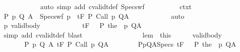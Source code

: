 \begin{isabellebody}
\ \ \ \ \ \ \ \ \ \ \isamarkupfalse%
\ {\isacharparenleft}auto\ simp\ add{\isacharcolon}\ cvalidt{\isacharunderscore}def\ Specs{\isacharunderscore}wf{\isacharparenright}\isanewline
\ \ \ \ \ \ \ \ \isamarkupfalse%
\ ctxt\ \isamarkupfalse%
\ {\isachardoublequoteopen}{\isasymforall}{\isacharparenleft}P{\isacharcomma}\ p{\isacharcomma}\ Q{\isacharcomma}\ A{\isacharparenright}{\isasymin}{\isasymTheta}\ {\isasymunion}\ Specs{\isacharunderscore}wf\ p\ {\isasymtau}{\isachardot}\ {\isasymGamma}{\isasymTurnstile}\isactrlsub t\isactrlbsub {\isacharslash}F\isactrlesub \ P\ Call\ p\ Q{\isacharcomma}A{\isachardoublequoteclose}\isanewline
\ \ \ \ \ \ \ \ \ \ \isamarkupfalse%
\ auto\isanewline
\ \ \ \ \ \ \ \ \isamarkupfalse%
\ p\ valid{\isacharunderscore}body\ \isanewline
\ \ \ \ \ \ \ \ \isamarkupfalse%
\ {\isachardoublequoteopen}{\isasymGamma}\ {\isasymTurnstile}\isactrlsub t\isactrlbsub {\isacharslash}F\isactrlesub \ {\isacharparenleft}{\isacharbraceleft}{\isasymtau}{\isacharbraceright}\ {\isasyminter}\ P{\isacharparenright}\ {\isacharparenleft}the\ {\isacharparenleft}{\isasymGamma}\ p{\isacharparenright}{\isacharparenright}\ Q{\isacharcomma}A{\isachardoublequoteclose}\isanewline
\ \ \ \ \ \ \ \ \ \ \isamarkupfalse%
\ {\isacharparenleft}simp\ add{\isacharcolon}\ cvalidt{\isacharunderscore}def{\isacharparenright}\ blast\isanewline
\ \ \ \ \ \ \isamarkupfalse%
\isanewline
\ \ \ \ \isacommand{{\isacharbraceright}}\isamarkupfalse%
\isanewline
\ \ \ \ \isamarkupfalse%
\ lem\ {\isacharequal}\ this\isanewline
\ \ \ \ \isamarkupfalse%
\ valid{\isacharunderscore}body{\isacharprime}{\isacharcolon}\ \isanewline
\ \ \ \ \ \ {\isachardoublequoteopen}{\isasymAnd}{\isasymtau}{\isachardot}\ {\isasymforall}{\isacharparenleft}P{\isacharcomma}\ p{\isacharcomma}\ Q{\isacharcomma}\ A{\isacharparenright}{\isasymin}{\isasymTheta}{\isachardot}\ {\isasymGamma}{\isasymTurnstile}\isactrlsub t\isactrlbsub {\isacharslash}F\isactrlesub \ P\ {\isacharparenleft}Call\ p{\isacharparenright}\ Q{\isacharcomma}A\ {\isasymLongrightarrow}\ \isanewline
\ \ \ \ \ \ {\isasymforall}{\isacharparenleft}P{\isacharcomma}p{\isacharcomma}Q{\isacharcomma}A{\isacharparenright}{\isasymin}Specs{\isachardot}\ {\isasymGamma}{\isasymTurnstile}\isactrlsub t\isactrlbsub {\isacharslash}F\isactrlesub \ {\isacharparenleft}{\isacharbraceleft}{\isasymtau}{\isacharbraceright}\ {\isasyminter}\ P{\isacharparenright}\ {\isacharparenleft}the\ {\isacharparenleft}{\isasymGamma}\ p{\isacharparenright}{\isacharparenright}\ Q{\isacharcomma}A{\isachardoublequoteclose}\isanewline

\end{isabellebody}
